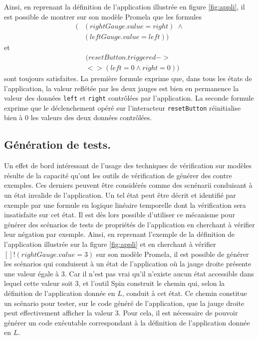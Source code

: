 \documentclass{ihm}
\begin{document}
Ainsi, en reprenant la définition de l'application illustrée en figure
\ref{fig:appli}, il est possible de montrer sur son modèle Promela que
les formules
\begin{align*}
[](&(rightGauge.value=right)\; \wedge \\
&(leftGauge.value=left))
\end{align*}
et 
\begin{align*}
[]&(resetButton.triggered -> \\
&<> (left=0 \wedge right=0))
\end{align*} 
sont toujours satisfaites.  La première formule exprime que, dans tous
les états de l'application, la valeur reflétée par les deux jauges est
bien  en   permanence  la  valeur  des   données  \lstinline$left$  et
\lstinline$right$  contrôlées par  l'application.  La seconde  formule
exprime    que    le    déclenchement    opéré    sur    l'interacteur
\lstinline$resetButton$  réinitialise bien  à 0  les valeurs  des deux
données contrôlées. 

\subsection{Génération de tests.}
Un effet de bord intéressant de l'usage des techniques de vérification
sur modèles résulte  de la capacité qu'ont les  outils de vérification
de générer des  contre exemples. Ces derniers  peuvent être considérés
comme des scnénarii conduisant à un état invalide de l'application. Un
tel état peut être décrit et  identifié par exemple par une formule en
logique linéaire temporelle dont la vérification sera insatisfaite sur
cet  état. Il  est  dès  lors possible  d'utiliser  ce mécanisme  pour
générer  des scénarios  de  tests de  propriétés  de l'application  en
cherchant à  vérifier leur négation  par exemple. Ainsi,  en reprenant
l'exemple de  la définition de  l'application illustrée sur  la figure
\ref{fig:appli} et  en cherchant  à vérifier $[]  !(rightGauge.value =
3)$ sur son  modèle Promela, il est possible de  générer les scénarios
qui conduisent à un état de  l'application où la jauge droite présente
une valeur égale à 3.  Car il n'est pas vrai qu'il n'existe aucun état
accessible dans lequel cette valeur  soit 3, et l'outil Spin construit
le chemin  qui, selon  la définition de  l'application donnée  en $L$,
conduit à cet  état. Ce chemin constitue un scénario  pour tester, sur
le  code   généré  de   l'application,  que   la  jauge   droite  peut
effectivement afficher  la valeur 3.  Pour cela, il est  nécessaire de
pouvoir générer  un code exécutable  correspondant à la  définition de
l'application donnée en $L$.
\end{document}

